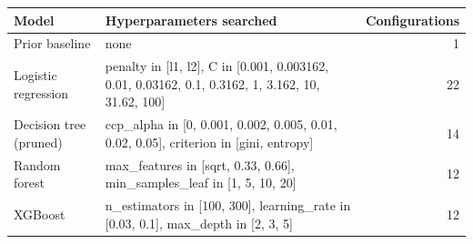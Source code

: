 \begin{tabular}{lp{10.5cm}r}
\toprule
\textbf{Model} & \textbf{Hyperparameters searched} & \textbf{Configurations} \\
\midrule
Prior baseline & none & 1 \\
Logistic regression & penalty in [l1, l2], C in [0.001, 0.003162, 0.01, 0.03162, 0.1, 0.3162, 1, 3.162, 10, 31.62, 100] & 22 \\
Decision tree (pruned) & ccp\_alpha in [0, 0.001, 0.002, 0.005, 0.01, 0.02, 0.05], criterion in [gini, entropy] & 14 \\
Random forest & max\_features in [sqrt, 0.33, 0.66], min\_samples\_leaf in [1, 5, 10, 20] & 12 \\
XGBoost & n\_estimators in [100, 300], learning\_rate in [0.03, 0.1], max\_depth in [2, 3, 5] & 12 \\
\bottomrule
\end{tabular}
